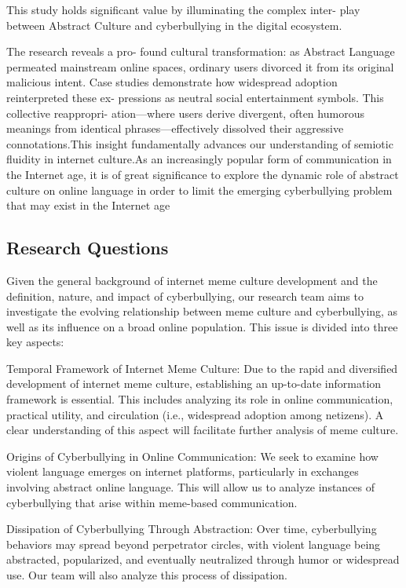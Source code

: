 \documentclass[12pt,a4paper]{ctexart}
\theoremstyle{MyLineTheoremStyle}
\theoremstyle{MyBlockTheoremStyle}
\theoremstyle{MySubsubsectionStyle}
\begin{document}
This  study  holds  significant value by  illuminating the  complex  inter- play between Abstract Culture and cyberbullying in the digital ecosystem.

The research reveals a pro- found cultural transformation: as Abstract Language permeated mainstream online spaces, ordinary users divorced it from its original malicious intent. Case studies demonstrate how widespread adoption reinterpreted these ex- pressions as neutral social entertainment symbols. This collective reappropri- ation—where users derive divergent, often humorous meanings from identical phrases—effectively dissolved their aggressive connotations.This insight fundamentally advances our understanding of semiotic fluidity in internet culture.As an increasingly popular form of communication in the Internet age, it is of great significance to explore the dynamic role of abstract culture on online language in order to limit the emerging cyberbullying problem that may exist in the Internet age

\subsection{Research Questions}

Given the general background of internet meme culture development and the definition, nature, and impact of cyberbullying, our research team aims to investigate the evolving relationship between meme culture and cyberbullying, as well as its influence on a broad online population. This issue is divided into three key aspects:

Temporal Framework of Internet Meme Culture: Due to the rapid and diversified development of internet meme culture, establishing an up-to-date information framework is essential. This includes analyzing its role in online communication, practical utility, and circulation (i.e., widespread adoption among netizens). A clear understanding of this aspect will facilitate further analysis of meme culture.

Origins of Cyberbullying in Online Communication: We seek to examine how violent language emerges on internet platforms, particularly in exchanges involving abstract online language. This will allow us to analyze instances of cyberbullying that arise within meme-based communication.

Dissipation of Cyberbullying Through Abstraction: Over time, cyberbullying behaviors may spread beyond perpetrator circles, with violent language being abstracted, popularized, and eventually neutralized through humor or widespread use. Our team will also analyze this process of dissipation.
\end{document}
